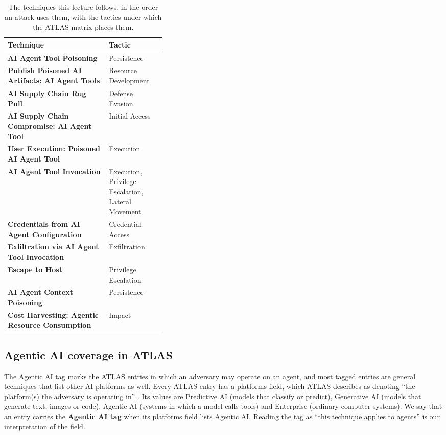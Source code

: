 \begin{table}[htbp]
  \caption{The techniques this lecture follows, in the order an attack uses them, with the tactics
  under which the ATLAS matrix places them.}
  \label{tab:threats-eleven}
  \begin{adjustbox}{width=\linewidth}\begin{tabularx}{\linewidth}{XL{0.36\linewidth}}
    \toprule
    \textbf{Technique} & \textbf{Tactic} \\
    \midrule
    \textbf{AI Agent Tool Poisoning} & Persistence \\
    \textbf{Publish Poisoned AI Artifacts: AI Agent Tools} & Resource Development \\
    \textbf{AI Supply Chain Rug Pull} & Defense Evasion \\
    \textbf{AI Supply Chain Compromise: AI Agent Tool} & Initial Access \\
    \textbf{User Execution: Poisoned AI Agent Tool} & Execution \\
    \textbf{AI Agent Tool Invocation} & Execution, Privilege Escalation, Lateral Movement \\
    \textbf{Credentials from AI Agent Configuration} & Credential Access \\
    \textbf{Exfiltration via AI Agent Tool Invocation} & Exfiltration \\
    \textbf{Escape to Host} & Privilege Escalation \\
    \textbf{AI Agent Context Poisoning} & Persistence \\
    \textbf{Cost Harvesting: Agentic Resource Consumption} & Impact \\
    \bottomrule
  \end{tabularx}\end{adjustbox}
\end{table}

\subsection{Agentic AI coverage in ATLAS}
\label{sec:threats-agentic}

The Agentic AI tag marks the ATLAS entries in which an adversary may operate on an agent, and most
tagged entries are general techniques that list other AI platforms as well. Every ATLAS entry has a
platforms field, which ATLAS describes as denoting ``the platform(s) the adversary is operating in''
\citep{mitre-atlas-2026}. Its values are Predictive AI (models that classify or predict),
Generative AI (models that generate text, images or code), Agentic AI (systems in which a model
calls tools) and Enterprise (ordinary computer systems). We say that an entry carries the
\textbf{Agentic AI tag} when its platforms field lists Agentic AI. Reading the tag as ``this
technique applies to agents'' is our interpretation of the field.

